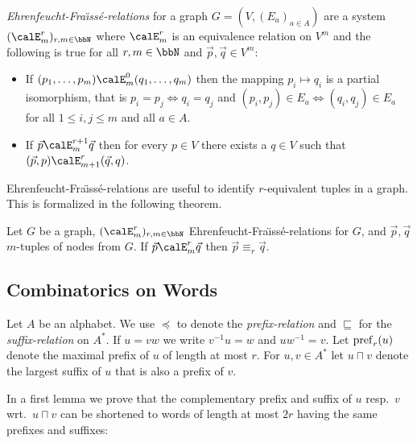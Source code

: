 \emph{Ehrenfeucht-Fra\"\i{}ss\'e-relations} for a graph $G = (V, (E_a)_{a\in A})$ are a system $(\calE^r_m)_{r,m\in\bbN}$ where  $\calE^r_m$ is an equivalence relation on $V^m$ and
the following is true for all $r,m\in\bbN$ and $\vec{p},\vec{q} \in V^m$:
\begin{itemize}
	\item If $(p_1,\ldots,p_m) \calE^0_m (q_1,\ldots,q_m)$ then the mapping $p_i \mapsto q_i$ is a partial isomorphism, that is $p_i= p_j \Leftrightarrow q_i=q_j$ and
	$(p_i,p_j)\in E_a \Leftrightarrow (q_i,q_j) \in E_a$ for all $1\leq i,j\leq m$ and all $a\in A$.
	\item If $\vec{p} \calE^{r+1}_m \vec{q}$ then for every $p\in V$ there exists a $q\in V$ such that $(\vec{p}, p) \calE^r_{m+1} (\vec{q}, q)$.
\end{itemize}

Ehrenfeucht-Fra\"\i{}ss\'e-relations are useful to identify $r$-equivalent tuples in a graph. This is formalized in the following theorem.
\begin{theorem}
	Let $G$ be a graph, $(\calE^r_m)_{r,m\in\bbN}$ Ehrenfeucht-Fra\"\i{}ss\'e-relations for $G$, and $\vec{p}, \vec{q}$ $m$-tuples of nodes from $G$. If $\vec{p} \calE^r_m \vec{q}$ then 
	$\vec{p} \equiv_r \vec{q}$.
\end{theorem} 

\subsection{Combinatorics on Words}
Let $A$ be an alphabet. We use $\preceq$ to denote the \emph{prefix-relation} and $\sqsubseteq$ for the \emph{suffix-relation} on $A^\ast$.  If $u= vw$ we write $v^{-1}u = w$ and
$uw^{-1} = v$.
Let $\operatorname{pref}_r(u)$ denote the maximal prefix of $u$ of length at most $r$. For $u,v\in A^\ast$ let $u \sqcap v$ denote the largest suffix of $u$ that is also a prefix of $v$.

In a first lemma we prove that the complementary prefix and suffix of $u$ resp.~$v$ wrt.~$u\sqcap v$ can be shortened to words of length at most $2r$ having the same prefixes and suffixes:

